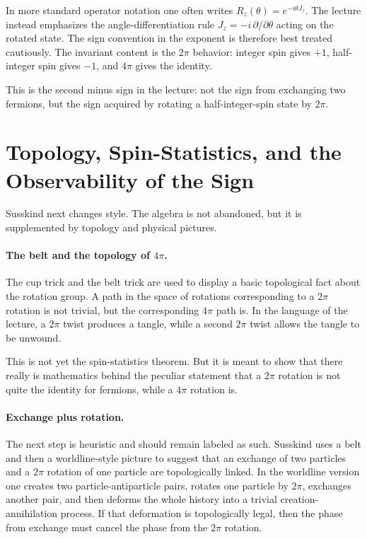 \begin{remark}
In more standard operator notation one often writes \(R_z(\theta)=e^{-i\theta J_z}\). The lecture instead emphasizes the angle-differentiation rule \(J_z=-i\,\partial/\partial\theta\) acting on the rotated state. The sign convention in the exponent is therefore best treated cautiously. The invariant content is the \(2\pi\) behavior: integer spin gives \(+1\), half-integer spin gives \(-1\), and \(4\pi\) gives the identity.
\end{remark}

This is the second minus sign in the lecture: not the sign from exchanging two fermions, but the sign acquired by rotating a half-integer-spin state by \(2\pi\).

\section{Topology, Spin-Statistics, and the Observability of the Sign}

Susskind next changes style. The algebra is not abandoned, but it is supplemented by topology and physical pictures.

\paragraph{The belt and the topology of \(4\pi\).}

The cup trick and the belt trick are used to display a basic topological fact about the rotation group. A path in the space of rotations corresponding to a \(2\pi\) rotation is not trivial, but the corresponding \(4\pi\) path is. In the language of the lecture, a \(2\pi\) twist produces a tangle, while a second \(2\pi\) twist allows the tangle to be unwound.

This is not yet the spin-statistics theorem. But it is meant to show that there really is mathematics behind the peculiar statement that a \(2\pi\) rotation is not quite the identity for fermions, while a \(4\pi\) rotation is.

\paragraph{Exchange plus rotation.}

The next step is heuristic and should remain labeled as such. Susskind uses a belt and then a worldline-style picture to suggest that an exchange of two particles and a \(2\pi\) rotation of one particle are topologically linked. In the worldline version one creates two particle-antiparticle pairs, rotates one particle by \(2\pi\), exchanges another pair, and then deforms the whole history into a trivial creation-annihilation process. If that deformation is topologically legal, then the phase from exchange must cancel the phase from the \(2\pi\) rotation.

